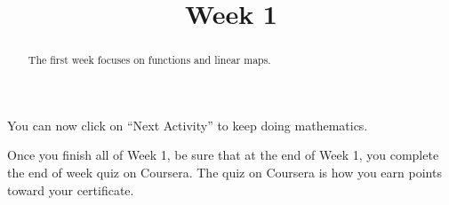 \documentclass{ximera}
\title{Week 1}
\begin{document}
\begin{abstract}
  The first week focuses on functions and linear maps.
\end{abstract}\maketitle


You can now click on ``Next Activity'' to keep doing mathematics.

Once you finish all of Week 1, be sure that at the end of Week 1, you
complete the end of week quiz on Coursera.  The quiz on Coursera is
how you earn points toward your certificate.
\end{document}
